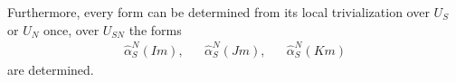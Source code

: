 Furthermore, every form can be determined from its local trivialization over $U_S$ or $U_N$ once, over $U_{SN}$ the forms
\begin{align}
    \hat \alpha^N_S(Im), && \hat \alpha^N_S(Jm), && \hat \alpha^N_S(Km)
\end{align}
are determined.








